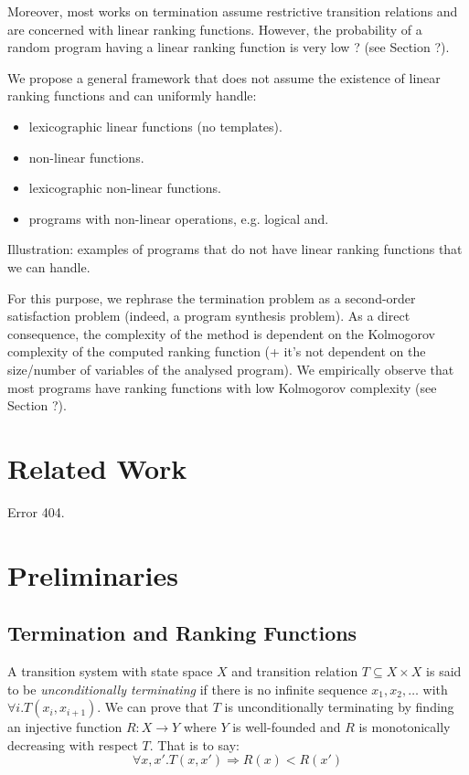 \documentclass[preprint]{sigplanconf}
\theoremstyle{definition}
\begin{document}
Moreover, most works on termination assume restrictive transition relations and are concerned with
linear ranking functions. However, the probability of a random program having a linear ranking
function is very low ? (see Section ?). 


We propose a general framework that does not assume the existence of linear ranking
functions and can uniformly handle:
\begin{itemize}
\item lexicographic linear functions (no templates).
\item non-linear functions.
\item lexicographic non-linear functions.
\item programs with non-linear operations, e.g. logical and.
\end{itemize}

Illustration: examples of programs that do not have linear ranking functions that we can handle.


For this purpose, we rephrase the termination problem as a second-order satisfaction problem
(indeed, a program synthesis problem).
 As a direct consequence, the complexity of the method is dependent on the Kolmogorov
 complexity of the computed ranking function (+ it's not dependent on the size/number
 of variables of the analysed program). We empirically observe that most programs have
 ranking functions with low Kolmogorov complexity (see Section ?). 



\section{Related Work}
Error 404.

\section{Preliminaries}
\subsection{Termination and Ranking Functions}
A transition system with state space $X$ and transition relation $T \subseteq X \times X$
is said to be \emph{unconditionally terminating} if there is no infinite sequence
$x_1, x_2, \ldots$ with $\forall i . T(x_i, x_{i+1})$.  We can prove that $T$ is
unconditionally terminating by finding an injective function $R: X \to Y$ where
$Y$ is well-founded and $R$ is monotonically decreasing with respect $T$.  That is
to say:
$$\forall x, x' . T(x, x') \Rightarrow R(x) < R(x')$$
\end{document}
